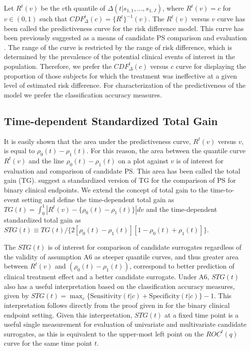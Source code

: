 \documentclass[times, doublespace]{simauth}
\begin{document}
Let $R^t(v)$ be the $v$th quantile of $\Delta(t|s_{1,1}, \dots, s_{1,J})$, where $R^t(v)=c$ for $v\in(0,1)$ such that $CDF^{t}_{\Delta}(c)=\{R^t\}^{-1}(v)$. The $R^t(v)$ versus $v$ curve has been called the predictiveness curve for the risk difference model. This curve has been previously suggested as a means of candidate PS comparison and evaluation \citep{Gilbert08}. The range of the curve is restricted by the range of risk difference, which is determined by the prevalence of the potential clinical events of interest in the population. Therefore, we prefer the $CDF^{t}_{\Delta}(c)$ versus $c$ curve for displaying the proportion of those subjects for which the treatment was ineffective at a given level of estimated risk difference. For characterization of the predictiveness of the model we prefer the classification accuracy measures.

\subsection{Time-dependent Standardized Total Gain} \label{STG}
It is easily shown that the area under the predictiveness curve, $R^t(v)$ versus $v$, is equal to $\rho_0(t)-\rho_1(t)$. For this reason, the area between the quantile curve $R^t(v)$ and the line $\rho_0(t)-\rho_1(t)$ on a plot against $v$ is of interest for evaluation and comparison of candidate PS. This area has been called the total gain (TG). \citet{Huang11} suggest a standardized version of TG for the comparison of PS for binary clinical endpoints. We extend the concept of total gain to the time-to-event setting and define the time-dependent total gain as $TG(t) = \int_0^{1}{|R^t(v) -\{\rho_0(t) -\rho_1(t)\}|dv}$ and the time-dependent standardized total gain as $STG(t) \equiv TG(t)/\{2[\rho_0(t) - \rho_1(t)][1-\rho_0(t) + \rho_1(t)]\}$.

The $STG(t)$ is of interest for comparison of candidate surrogates regardless of the validity of assumption A6 as steeper quantile curves, and thus greater area between $R^t(v)$ and $(\rho_0(t) -\rho_1(t))$, correspond to better prediction of clinical treatment effect and a better candidate surrogate. Under A6, $STG(t)$ also has a useful interpretation based on the classification accuracy measures, given by $STG(t)=\max_c\{\mbox{Sensitivity}(t|c) + \mbox{Specificity}(t|c)\} -1$. This interpretation follows directly from the proof given in \citet{Huang11} for the binary clinical endpoint setting. Given this interpretation, $STG(t)$ at a fixed time point is a useful single measurement for evaluation of univariate and multivariate candidate surrogates, as this is equivalent to the upper-most left point on the $ROC^{t}(q)$ curve for the same time point $t$.
\end{document}
